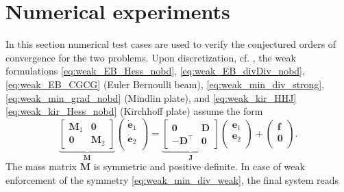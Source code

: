 \section{Numerical experiments}
\label{sec:numerics_mixed}
In this section numerical test cases are used to verify the conjectured orders of convergence for the two problems. Upon discretization, cf. , the weak formulations \eqref{eq:weak_EB_Hess_nobd}, \eqref{eq:weak_EB_divDiv_nobd}, \eqref{eq:weak_EB_CGCG} (Euler Bernoulli beam), \eqref{eq:weak_min_div_strong}, \eqref{eq:weak_min_grad_nobd} (Mindlin plate), and \eqref{eq:weak_kir_HHJ} \eqref{eq:weak_kir_Hess_nobd} (Kirchhoff plate) assume the form 
\begin{equation*}
\underbrace{
	\begin{bmatrix}
	\mathbf{M}_1 & \mathbf{0} \\
	\mathbf{0} & \mathbf{M}_2
	\end{bmatrix}}_{\mathbf{M}}
\begin{pmatrix}
\dot{\mathbf{e}}_1 \\
\dot{\mathbf{e}}_2 \\
\end{pmatrix} = 
\underbrace{
	\begin{bmatrix}
	\mathbf{0} & \mathbf{D} \\
	-\mathbf{D}^\top & \mathbf{0}
	\end{bmatrix}}_{\mathbf{J}}
\begin{pmatrix}
{\mathbf{e}}_1 \\
{\mathbf{e}}_2 \\
\end{pmatrix} + 
\begin{pmatrix}
\mathbf{f} \\
\mathbf{0} \\
\end{pmatrix}. 
\end{equation*}
The mass matrix $\mathbf{M}$ is symmetric and positive definite. In case of weak enforcement of the symmetry \eqref{eq:weak_min_div_weak}, the final system reads
